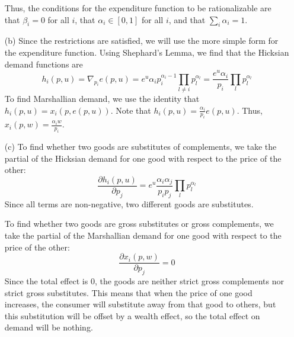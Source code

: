 \documentclass[12pt]{article}
\begin{document}
\begin{itemize}
    Thus, the conditions for the expenditure function to be rationalizable are that $\beta_i = 0$ for all $i$, that $\alpha_i \in [0,1]$ for all $i$, and that $\sum_i \alpha_i = 1$.

    \item[(b)] Since the restrictions are satisfied, we will use the more simple form for the expenditure function. Using Shephard's Lemma, we find that the Hicksian demand functions are
    \[
    h_i(p,u) = \nabla_{p_i} e(p,u) = e^u \alpha_i p_i^{\alpha_i - 1} \prod_{l \ne i} p_l^{\alpha_l} = \frac{e^u \alpha_i}{p_i} \prod_{l} p_l^{\alpha_l}
    \]
    To find Marshallian demand, we use the identity that $h_i(p,u) = x_i(p,e(p,u))$. Note that $h_i(p,u) = \frac{\alpha_i}{p_i} e(p,u)$. Thus, $x_i(p,w) = \frac{\alpha_i w}{p_i}$.

    \item[(c)] To find whether two goods are substitutes of complements, we take the partial of the Hicksian demand for one good with respect to the price of the other:
    \[
    \frac{\partial h_i(p,u)}{\partial p_j} = e^u \frac{\alpha_i \alpha_j}{p_ip_j} \prod_{l} p_l^{\alpha_l}
    \]
    Since all terms are non-negative, two different goods are substitutes.

    \smallskip

    To find whether two goods are gross substitutes or gross complements, we take the partial of the Marshallian demand for one good with respect to the price of the other:
    \[
    \frac{\partial x_i(p,w)}{\partial p_j} = 0
    \]
    Since the total effect is 0, the goods are neither strict gross complements nor strict gross substitutes. This means that when the price of one good increases, the consumer will substitute away from that good to others, but this substitution will be offset by a wealth effect, so the total effect on demand will be nothing.


\end{itemize}
\end{document}
